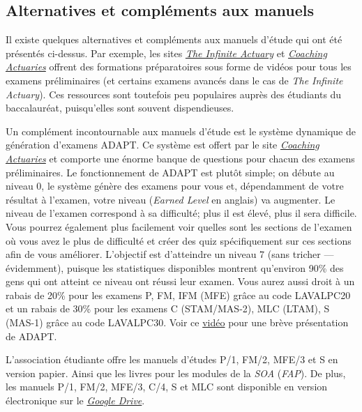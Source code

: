 \newpage

\subsection*{Alternatives et compléments aux manuels}
\label{subsec:alternatives}
Il existe quelques alternatives et compléments aux manuels d'étude qui ont été présentés ci-dessus. Par exemple, les sites \href{http://www.theinfiniteactuary.com/}{\emph{The Infinite Actuary}} et \href{https://www.coachingactuaries.com/}{\emph{Coaching Actuaries}} offrent des formations préparatoires sous forme de vidéos pour tous les examens préliminaires (et certains examens avancés dans le cas de \emph{The Infinite Actuary}). Ces ressources sont toutefois peu populaires auprès des étudiants du baccalauréat, puisqu'elles sont souvent dispendieuses.\vspace{\baselineskip}

Un complément incontournable aux manuels d'étude est le système dynamique de génération d'examens ADAPT. Ce système est offert par le site \href{https://www.coachingactuaries.com/}{\emph{Coaching Actuaries}} et comporte une énorme banque de questions pour chacun des examens préliminaires. Le fonctionnement de ADAPT est plutôt simple; on débute au niveau 0, le système génère des examens pour vous et, dépendamment de votre résultat à l'examen, votre niveau (\emph{Earned Level} en anglais) va augmenter. Le niveau de l'examen correspond à sa difficulté; plus il est élevé, plus il sera difficile. Vous pourrez également plus facilement voir quelles sont les sections de l'examen où vous avez le plus de difficulté et créer des quiz spécifiquement sur ces sections afin de vous améliorer. L'objectif est d'atteindre un niveau 7 (sans tricher --- évidemment), puisque les statistiques disponibles montrent qu'environ 90\% des gens qui ont atteint ce niveau ont réussi leur examen. Vous aurez aussi droit à un rabais de 20\% pour les examens P, FM, IFM (MFE) grâce au code LAVALPC20 et un rabais de 30\% pour les examens C (STAM/MAS-2), MLC (LTAM), S (MAS-1) grâce au code LAVALPC30. Voir ce \href{https://www.youtube.com/watch?v=ZBxLa2J5jhs}{vidéo} pour une brève présentation de ADAPT.

L'association étudiante offre les manuels d'études P/1, FM/2, MFE/3 et S en version papier. Ainsi que les livres pour les modules de la \textit{SOA} (\textit{FAP}). De plus, les manuels P/1, FM/2, MFE/3, C/4, S et MLC sont disponible en version électronique sur le \href{https://drive.google.com/open?id=0B6kXivc6X9LISE1ydE41UnY3UDQ}{\textit{Google Drive}}.
\newpage